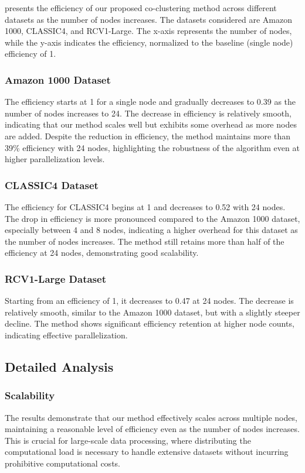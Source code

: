 \documentclass[journal]{IEEEtran}
\begin{document}
 presents the efficiency of our proposed co-clustering method across different datasets as the number of nodes increases. The datasets considered are Amazon 1000, CLASSIC4, and RCV1-Large. The x-axis represents the number of nodes, while the y-axis indicates the efficiency, normalized to the baseline (single node) efficiency of 1.

\subsubsection{Amazon 1000 Dataset}
The efficiency starts at 1 for a single node and gradually decreases to 0.39 as the number of nodes increases to 24. The decrease in efficiency is relatively smooth, indicating that our method scales well but exhibits some overhead as more nodes are added. Despite the reduction in efficiency, the method maintains more than 39\% efficiency with 24 nodes, highlighting the robustness of the algorithm even at higher parallelization levels.

\subsubsection{CLASSIC4 Dataset}
The efficiency for CLASSIC4 begins at 1 and decreases to 0.52 with 24 nodes. The drop in efficiency is more pronounced compared to the Amazon 1000 dataset, especially between 4 and 8 nodes, indicating a higher overhead for this dataset as the number of nodes increases. The method still retains more than half of the efficiency at 24 nodes, demonstrating good scalability.

\subsubsection{RCV1-Large Dataset}
Starting from an efficiency of 1, it decreases to 0.47 at 24 nodes. The decrease is relatively smooth, similar to the Amazon 1000 dataset, but with a slightly steeper decline. The method shows significant efficiency retention at higher node counts, indicating effective parallelization.

\subsection{Detailed Analysis}

\subsubsection{Scalability}
The results demonstrate that our method effectively scales across multiple nodes, maintaining a reasonable level of efficiency even as the number of nodes increases. This is crucial for large-scale data processing, where distributing the computational load is necessary to handle extensive datasets without incurring prohibitive computational costs.
\end{document}
